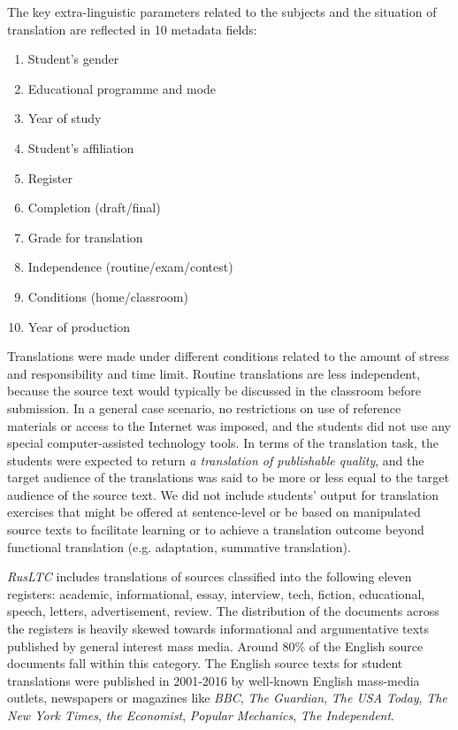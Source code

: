 The key extra-linguistic parameters related to the subjects and the situation of translation are reflected in 10 metadata fields:
\begin{enumerate}\compresslist{}
	\item Student's gender
	\item Educational programme and mode
	\item Year of study
	\item Student's affiliation
	\item Register
	\item Completion (draft/final)
	\item Grade for translation
	\item Independence (routine/exam/contest) 
	\item Conditions (home/classroom)
	\item Year of production
\end{enumerate}

Translations were made under different conditions related to the amount of stress and responsibility and time limit. Routine translations are less independent, because the source text would typically be discussed in the classroom before submission. In a general case scenario, no restrictions on use of reference materials or access to the Internet was imposed, and the students did not use any special computer-assisted technology tools. 
In terms of the translation task, the students were expected to return \textit{a translation of publishable quality}, and the target audience of the translations was said to be more or less equal to the target audience of the source text. We did not include students' output for translation exercises that might be offered at sentence-level or be based on manipulated source texts to facilitate learning or to achieve a translation outcome beyond functional translation (e.g. adaptation, summative translation). 

\textit{RusLTC} includes translations of sources classified into the following eleven registers: academic, informational, essay, interview, tech, fiction, educational, speech, letters, advertisement, review. The distribution of the documents across the registers is heavily skewed towards informational and argumentative texts published by general interest mass media. Around 80\% of the English source documents fall within this category.
The English source texts for student translations were published in 2001-2016 by well-known English mass-media outlets, newspapers or magazines like \textit{BBC}, \textit{The Guardian}, \textit{The USA Today}, \textit{The New York Times}, \textit{the Economist}, \textit{Popular Mechanics}, \textit{The Independent}.

